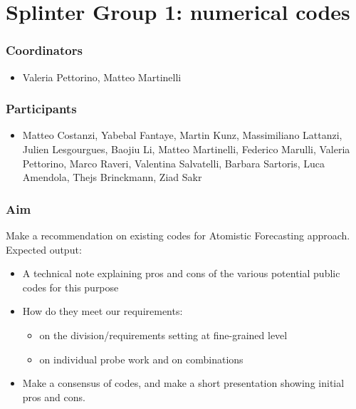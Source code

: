 



%

\section{Splinter Group 1: numerical codes}

\subsubsection*{Coordinators}
\begin{itemize}
 \item Valeria Pettorino, Matteo Martinelli
\end{itemize}
\subsubsection*{Participants}
\begin{itemize}
 \item Matteo Costanzi,  Yabebal Fantaye, Martin Kunz, Massimiliano Lattanzi, Julien Lesgourgues, Baojiu Li, Matteo Martinelli, Federico Marulli, Valeria Pettorino, Marco Raveri, Valentina Salvatelli, Barbara Sartoris, Luca Amendola, Thejs Brinckmann, Ziad Sakr
\end{itemize}

\subsubsection*{Aim}
Make a recommendation on existing codes for Atomistic Forecasting approach.\\
Expected output:
\begin{itemize}
 \item A technical note explaining pros and cons of the various potential public codes for this purpose 
 \item How do they meet our requirements:
 \begin{itemize}
  \item on the division/requirements setting at fine-grained level 
  \item on individual probe work and on combinations
 \end{itemize}
 \item Make a consensus of codes, and make a short presentation showing initial pros and cons.
\end{itemize}

